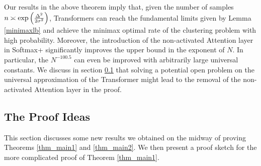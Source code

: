 \begin{remark}
    Our results in the above theorem imply that, given the number of samples $n\asymp \exp\left(\frac{\Delta^2}{2\sigma^2}\right)$, Transformers can reach the fundamental limits given by Lemma \ref{minimaxlb} and achieve the minimax optimal rate of the clustering problem with high probability. Moreover, the introduction of the non-activated Attention layer in Softmax+ significantly improves the upper bound in the exponent of $N$. In particular, the $N^{-100.5}$ can even be improved with arbitrarily large universal constants. We discuss in section \ref{approx3} that solving a potential open problem on the universal approximation of the Transformer might lead to the removal of the non-activated Attention layer in the proof. 
\end{remark}
\subsection{The Proof Ideas}\label{approx3}
This section discusses some new results we obtained on the midway of proving Theorems \ref{thm_main1} and \ref{thm_main2}. We then present a proof sketch for the more complicated proof of Theorem \ref{thm_main1}.
